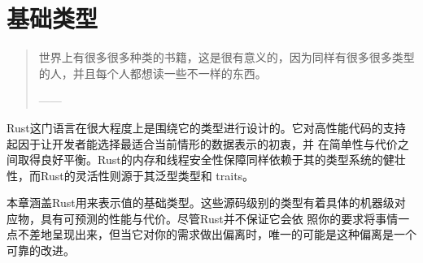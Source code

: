 \chapter{基础类型}\label{CHP3}

\begin{quote}
    世界上有很多很多种类的书籍，这是很有意义的，因为同样有很多很多类型的人，并且每个人都想读一些不一样的东西。
    \begin{flushright}
        ------
    \end{flushright}
\end{quote}

\medskip
Rust这门语言在很大程度上是围绕它的类型进行设计的。它对高性能代码的支持起因于让开发者能选择最适合当前情形的数据表示的初衷，并
在简单性与代价之间取得良好平衡。Rust的内存和线程安全性保障同样依赖于其的类型系统的健壮性，而Rust的灵活性则源于其泛型类型和
traits。

\medskip
本章涵盖Rust用来表示值的基础类型。这些源码级别的类型有着具体的机器级对应物，具有可预测的性能与代价。尽管Rust并不保证它会依
照你的要求将事情一点不差地呈现出来，但当它对你的需求做出偏离时，唯一的可能是这种偏离是一个可靠的改进。

